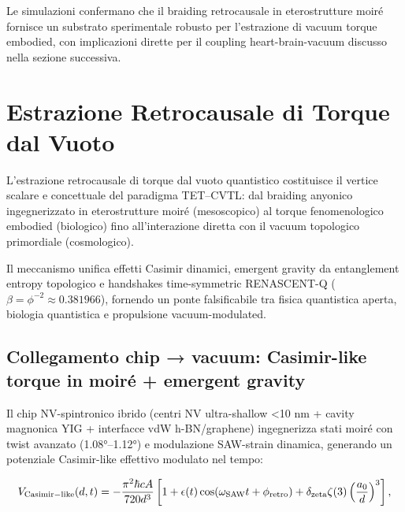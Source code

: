 \documentclass[11pt,a4paper]{article}
\theoremstyle{plain}
\theoremstyle{definition}
\begin{document}
Le simulazioni confermano che il braiding retrocausale in eterostrutture moiré fornisce un substrato sperimentale robusto per l'estrazione di vacuum torque embodied, con implicazioni dirette per il coupling heart-brain-vacuum discusso nella sezione successiva.



\vspace{0.4cm}

\section{Estrazione Retrocausale di Torque dal Vuoto}

L'estrazione retrocausale di torque dal vuoto quantistico costituisce il vertice scalare e concettuale del paradigma TET–CVTL: dal braiding anyonico ingegnerizzato in eterostrutture moiré (mesoscopico) al torque fenomenologico embodied (biologico) fino all'interazione diretta con il vacuum topologico primordiale (cosmologico). 

\vspace{0.3cm}

Il meccanismo unifica effetti Casimir dinamici, emergent gravity da entanglement entropy topologico e handshakes time-symmetric RENASCENT-Q ($\beta = \phi^{-2} \approx 0.381966$), fornendo un ponte falsificabile tra fisica quantistica aperta, biologia quantistica e propulsione vacuum-modulated.



\vspace{0.4cm}

\subsection{Collegamento chip → vacuum: Casimir-like torque in moiré + emergent gravity}

Il chip NV-spintronico ibrido (centri NV ultra-shallow <10 nm + cavity magnonica YIG + interfacce vdW h-BN/graphene) ingegnerizza stati moiré con twist avanzato (1.08°–1.12°) e modulazione SAW-strain dinamica, generando un potenziale Casimir-like effettivo modulato nel tempo:

\begin{equation}
V_{\rm Casimir-like}(d,t) = -\frac{\pi^2 \hbar c A}{720 d^3} \left[ 1 + \epsilon(t) \cos(\omega_{\rm SAW} t + \phi_{\rm retro}) + \delta_{\rm zeta} \zeta(3) \left( \frac{a_0}{d} \right)^3 \right],
\label{eq:casimir_modulated_full}
\end{equation}
\end{document}
